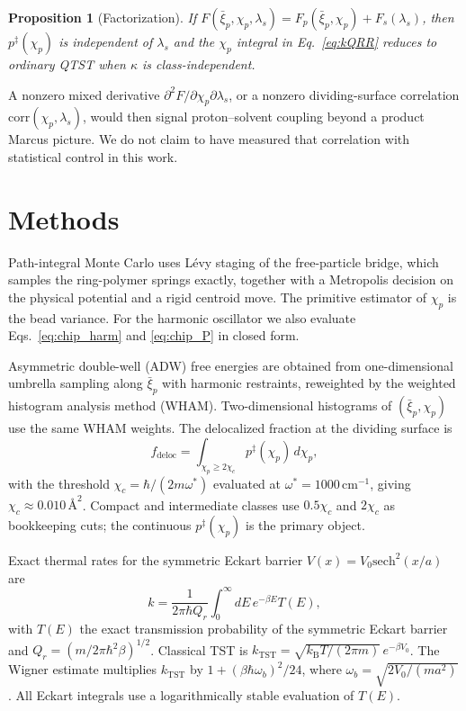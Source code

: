 \documentclass[%
 aip,
 jcp,
 amsmath,amssymb,
 reprint,
 floatfix,
]{revtex4-2}
\newtheorem{proposition}{Proposition}
\newcommand{\xip}{\bar{\xi}_p}
\newcommand{\chip}{\chi_p}
\newcommand{\kB}{k_{\mathrm{B}}}
\begin{document}
\begin{proposition}[Factorization]
\label{prop:factorize}
If $F(\xip,\chip,\lambda_s)=F_p(\xip,\chip)+F_s(\lambda_s)$, then $p^\ddagger(\chip)$ is independent of $\lambda_s$ and the $\chip$ integral in Eq.~\eqref{eq:kQRR} reduces to ordinary QTST when $\kappa$ is class-independent.
\end{proposition}

A nonzero mixed derivative $\partial^2 F/\partial\chip\partial\lambda_s$, or a nonzero dividing-surface correlation $\mathrm{corr}(\chip,\lambda_s)$, would then signal proton--solvent coupling beyond a product Marcus picture.\cite{marcus1956,soudackov2000} We do not claim to have measured that correlation with statistical control in this work.

\section{Methods}
\label{sec:methods}

Path-integral Monte Carlo uses L\'evy staging of the free-particle bridge,\cite{ceperley1995,tuckerman1993} which samples the ring-polymer springs exactly, together with a Metropolis decision on the physical potential and a rigid centroid move. The primitive estimator of $\chip$ is the bead variance. For the harmonic oscillator we also evaluate Eqs.~\eqref{eq:chip_harm} and \eqref{eq:chip_P} in closed form.

Asymmetric double-well (ADW) free energies are obtained from one-dimensional umbrella sampling along $\xip$\cite{torrie1977} with harmonic restraints, reweighted by the weighted histogram analysis method (WHAM).\cite{kumar1992} Two-dimensional histograms of $(\xip,\chip)$ use the same WHAM weights. The delocalized fraction at the dividing surface is
\begin{equation}
  f_{\mathrm{deloc}}
  =
  \int_{\chip\ge 2\chi_c} p^\ddagger(\chip)\,d\chip,
\end{equation}
with the threshold $\chi_c=\hbar/(2m\omega^*)$ evaluated at $\omega^*=1000\,\mathrm{cm}^{-1}$, giving $\chi_c\approx 0.010\,\text{\AA}^2$. Compact and intermediate classes use $0.5\chi_c$ and $2\chi_c$ as bookkeeping cuts; the continuous $p^\ddagger(\chip)$ is the primary object.

Exact thermal rates for the symmetric Eckart barrier $V(x)=V_0\mathrm{sech}^2(x/a)$ are
\begin{equation}
  k
  =
  \frac{1}{2\pi\hbar Q_r}
  \int_0^\infty dE\,e^{-\beta E}T(E),
\end{equation}
with $T(E)$ the exact transmission probability of the symmetric Eckart barrier\cite{eckart1930} and $Q_r=(m/2\pi\hbar^2\beta)^{1/2}$. Classical TST is $k_{\mathrm{TST}}=\sqrt{\kB T/(2\pi m)}\,e^{-\beta V_0}$. The Wigner estimate multiplies $k_{\mathrm{TST}}$ by $1+(\beta\hbar\omega_b)^2/24$, where $\omega_b=\sqrt{2V_0/(ma^2)}$. All Eckart integrals use a logarithmically stable evaluation of $T(E)$.\cite{eckart1930}
\end{document}
